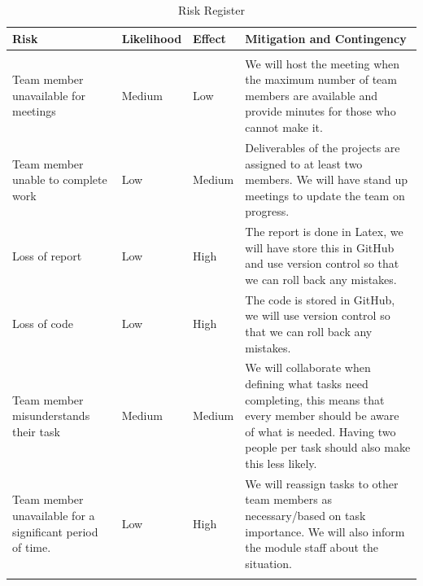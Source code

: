 \documentclass{article}
\begin{document}
\begin{longtable}{p{}p{}p{}p{}}
    \toprule
    Risk & Likelihood & Effect & Mitigation and Contingency \\ \midrule
    \hline \\
    Team member unavailable for meetings                      & Medium     & Low    & We will host the meeting when the maximum number of team members are available and provide minutes for those who cannot make it.                                                             \\
    Team member unable to complete work                       & Low        & Medium & Deliverables of the projects are assigned to at least two members. We will have stand up meetings to update the team on progress.                                                           \\
    Loss of report                                            & Low        & High   & The report is done in Latex, we will have store this in GitHub and use version control so that we can roll back any mistakes.                                                               \\
    Loss of code                                              & Low        & High   & The code is stored in GitHub, we will use version control so that we can roll back any mistakes.                                                                                            \\
    Team member misunderstands their task                     & Medium     & Medium & We will collaborate when defining what tasks need completing, this means that every member should be aware of what is needed. Having two people per task should also make this less likely. \\
    Team member unavailable for a significant period of time. & Low        & High   & We will reassign tasks to other team members as necessary/based on task importance. We will also inform the module staff about the situation. \\ \bottomrule
    \caption{Risk Register}
    \label{tab:RiskRegister}
\end{longtable}
\end{document}
